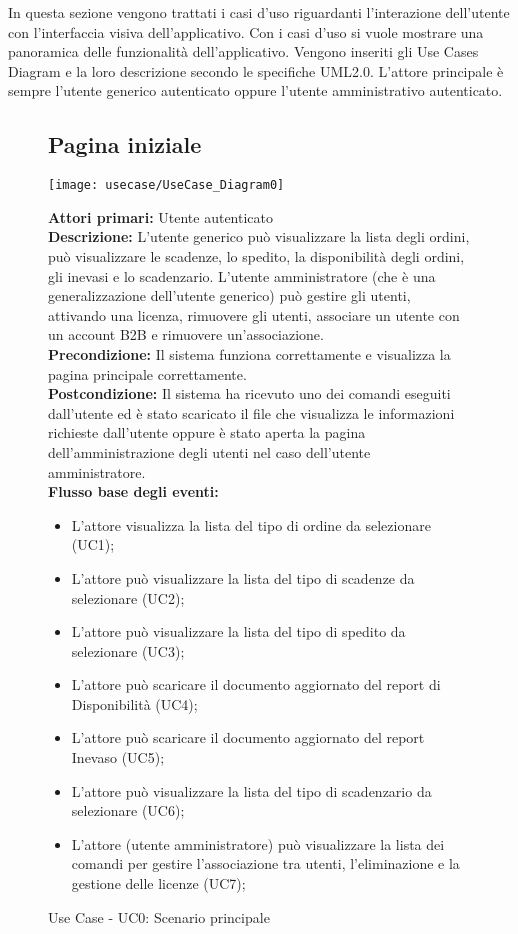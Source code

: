 In questa sezione vengono trattati i casi d'uso riguardanti l'interazione dell'utente con l'interfaccia visiva dell'applicativo. Con i casi d'uso si vuole mostrare una panoramica delle funzionalità dell'applicativo. Vengono inseriti gli \gls{Use Cases Diagram} e la loro descrizione secondo le specifiche \gls{UML2.0}. L'attore principale è sempre l'utente generico autenticato oppure l'utente  amministrativo autenticato.
\begin{figure}[h!]
\subsection{Pagina iniziale } 
   \begin{center}
    \texttt{[image: usecase/UseCase\_Diagram0]} 
    \caption{Use Case - UC0: Scenario principale}
    \end{center}



\textbf{Attori primari:}   Utente autenticato\\

\textbf{Descrizione:} L'utente generico può visualizzare la lista degli ordini, può visualizzare le scadenze, lo spedito, la disponibilità degli ordini, gli inevasi e lo scadenzario. L'utente amministratore (che è una generalizzazione dell'utente generico) può gestire gli utenti, attivando una licenza, rimuovere gli utenti, associare un utente con un account B2B e rimuovere un'associazione. \\

\textbf{Precondizione:}  Il sistema funziona correttamente e visualizza la pagina principale correttamente. \\

\textbf{Postcondizione:} Il sistema ha ricevuto uno dei comandi eseguiti dall'utente ed è stato scaricato il file che visualizza le informazioni richieste dall'utente oppure è stato aperta la pagina dell'amministrazione degli utenti nel caso dell'utente amministratore.\\


\textbf{Flusso base degli eventi:}   
\begin{itemize}
\item L'attore visualizza la lista del tipo di ordine da selezionare (UC1);
\item L'attore può visualizzare la lista del tipo di scadenze da selezionare (UC2);
\item L'attore può visualizzare la lista del tipo di spedito da selezionare (UC3);
\item L'attore può scaricare il documento aggiornato  del report di Disponibilità (UC4);
\item L'attore può scaricare il documento aggiornato del report Inevaso (UC5);
\item L'attore può visualizzare la lista del tipo di scadenzario da selezionare (UC6);
\item L'attore (utente amministratore) può visualizzare la lista dei comandi per gestire l'associazione tra utenti, l'eliminazione e la gestione delle licenze (UC7);
\end{itemize}
\end{figure}




